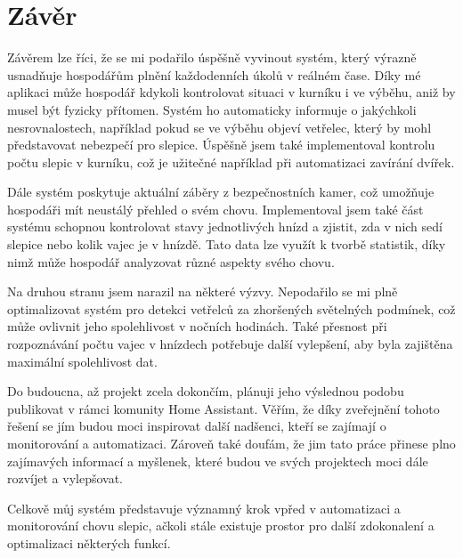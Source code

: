 ﻿\setlength{\parindent}{0pt}

\newpage
\chapter{Závěr}\label{ch:zaver}

Závěrem lze říci, že se mi podařilo úspěšně vyvinout systém, který výrazně usnadňuje hospodářům plnění každodenních úkolů v reálném čase.
Díky mé aplikaci může hospodář kdykoli kontrolovat situaci v kurníku i ve výběhu, aniž by musel být fyzicky přítomen.
Systém ho automaticky informuje o jakýchkoli nesrovnalostech, například pokud se ve výběhu objeví vetřelec, který by mohl představovat nebezpečí pro slepice.
Úspěšně jsem také implementoval kontrolu počtu slepic v kurníku, což je užitečné například při automatizaci zavírání dvířek.

Dále systém poskytuje aktuální záběry z bezpečnostních kamer, což umožňuje hospodáři mít neustálý přehled o svém chovu.
Implementoval jsem také část systému schopnou kontrolovat stavy jednotlivých hnízd a zjistit, zda v nich sedí slepice nebo kolik vajec je v hnízdě.
Tato data lze využít k tvorbě statistik, díky nimž může hospodář analyzovat různé aspekty svého chovu.

Na druhou stranu jsem narazil na některé výzvy.
Nepodařilo se mi plně optimalizovat systém pro detekci vetřelců za zhoršených světelných podmínek, což může ovlivnit jeho spolehlivost v nočních hodinách.
Také přesnost při rozpoznávání počtu vajec v hnízdech potřebuje další vylepšení, aby byla zajištěna maximální spolehlivost dat.

Do budoucna, až projekt zcela dokončím, plánuji jeho výslednou podobu publikovat v rámci komunity Home Assistant.
Věřím, že díky zveřejnění tohoto řešení se jím budou moci inspirovat další nadšenci, kteří se zajímají o monitorování a automatizaci.
Zároveň také doufám, že jim tato práce přinese plno zajímavých informací a myšlenek, které budou ve svých projektech moci dále rozvíjet a vylepšovat.

Celkově můj systém představuje významný krok vpřed v automatizaci a monitorování chovu slepic, ačkoli stále existuje prostor pro další zdokonalení a optimalizaci některých funkcí.
